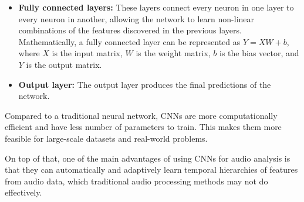 \begin{itemize}
\item \textbf{Fully connected layers:} These layers connect every neuron in one layer to every neuron in another, allowing the network to learn non-linear combinations of the features discovered in the previous layers. Mathematically, a fully connected layer can be represented as $Y = XW + b$, where $X$ is the input matrix, $W$ is the weight matrix, $b$ is the bias vector, and $Y$ is the output matrix.
\vspace*{3mm}

\item \textbf{Output layer:} The output layer produces the final predictions of the network.

\end{itemize}

Compared to a traditional neural network, CNNs are more computationally efficient and have less number of parameters to train. This makes them more feasible for large-scale datasets and real-world problems.

On top of that, one of the main advantages of using CNNs for audio analysis is that they can automatically and adaptively learn temporal hierarchies of features from audio data, which traditional audio processing methods may not do effectively. 



\newpage


